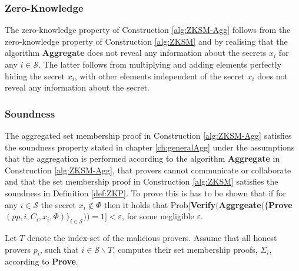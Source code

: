
\subsubsection*{Zero-Knowledge}
The zero-knowledge property of Construction \ref{alg:ZKSM-Agg} follows from the zero-knowledge property of Construction \ref{alg:ZKSM} and by realising that the algorithm \textbf{Aggregate} does not reveal any information about the secrets $x_i$ for any $i\in\mathcal{S}$. The latter follows from multiplying and adding elements perfectly hiding the secret $x_i$, with other elements independent of the secret $x_i$ does not reveal any information about the secret. 

\subsubsection*{Soundness}
The aggregated set membership proof in Construction \ref{alg:ZKSM-Agg} satisfies the soundness property stated in chapter \ref{ch:generalAgg} under the assumptions that the aggregation is performed according to the algorithm \textbf{Aggregate} in Construction \ref{alg:ZKSM-Agg},  that provers cannot communicate or collaborate and that the set membership proof in Construction \ref{alg:ZKSM} satisfies the soundness in Definition \ref{def:ZKP}. To prove this is has to be shown that if for any $i\in\mathcal{S}$ the secret $x_i\notin\Phi$ then it holds that Prob$[ $\textbf{Verify}$($\textbf{Aggrgeate}$(\{$\textbf{Prove}$(pp,i,C_i,x_i,\Phi)\}_{i\in\mathcal{S}}) ) = 1] < \varepsilon$, for some negligible $\varepsilon$.


Let $T$ denote the index-set of the malicious provers. Assume that all honest provers $p_i$, such that $i\in\mathcal{S}\backslash T$, computes their set membership proofs, $\Sigma_i$, according to \textbf{Prove}.


